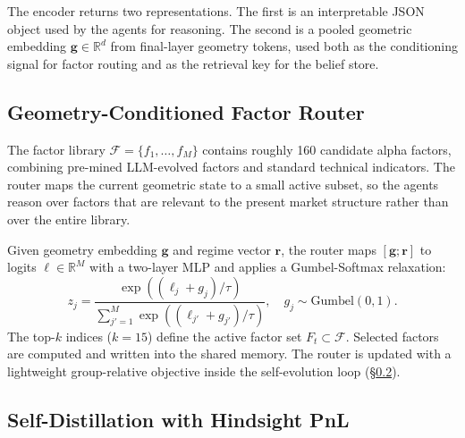 The encoder returns two representations. The first is an interpretable JSON object used by the agents for reasoning. The second is a pooled geometric embedding $\mathbf{g} \in \mathbb{R}^d$ from final-layer geometry tokens, used both as the conditioning signal for factor routing and as the retrieval key for the belief store.

\subsection{Geometry-Conditioned Factor Router}
\label{sec:router}

The factor library $\mathcal{F}=\{f_1,\ldots,f_M\}$ contains roughly 160 candidate alpha factors, combining pre-mined LLM-evolved factors and standard technical indicators. The router maps the current geometric state to a small active subset, so the agents reason over factors that are relevant to the present market structure rather than over the entire library.

Given geometry embedding $\mathbf{g}$ and regime vector $\mathbf{r}$, the router maps $[\mathbf{g};\mathbf{r}]$ to logits $\boldsymbol{\ell}\in\mathbb{R}^M$ with a two-layer MLP and applies a Gumbel-Softmax relaxation:
\begin{equation}
\label{eq:gumbel}
z_j = \frac{\exp((\ell_j + g_j) / \tau)}{\sum_{j'=1}^{M} \exp((\ell_{j'} + g_{j'}) / \tau)}, \quad g_j \sim \mathrm{Gumbel}(0, 1).
\end{equation}
The top-$k$ indices ($k{=}15$) define the active factor set $F_t\subset\mathcal{F}$. Selected factors are computed and written into the shared memory. The router is updated with a lightweight group-relative objective inside the self-evolution loop (\S\ref{sec:opsd}).

\subsection{Self-Distillation with Hindsight PnL}
\label{sec:opsd}

